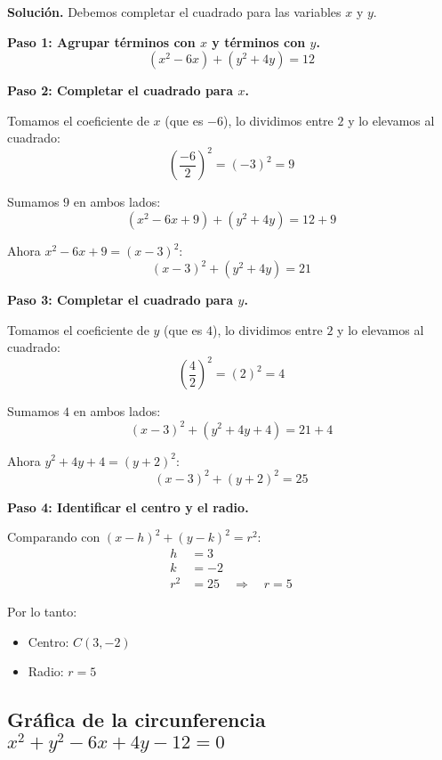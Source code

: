 \documentclass[12pt,a4paper]{article}
\begin{document}
	\textbf{Solución.} Debemos completar el cuadrado para las variables $x$ y $y$.

	\bigskip

	\textbf{Paso 1: Agrupar términos con $x$ y términos con $y$.}
	\[
	(x^2-6x)+(y^2+4y)=12
	\]

	\textbf{Paso 2: Completar el cuadrado para $x$.}

	Tomamos el coeficiente de $x$ (que es $-6$), lo dividimos entre $2$ y lo elevamos al cuadrado:
	\[
	\left(\frac{-6}{2}\right)^2=(-3)^2=9
	\]

	Sumamos $9$ en ambos lados:
	\[
	(x^2-6x+9)+(y^2+4y)=12+9
	\]

	Ahora $x^2-6x+9=(x-3)^2$:
	\[
	(x-3)^2+(y^2+4y)=21
	\]

	\textbf{Paso 3: Completar el cuadrado para $y$.}

	Tomamos el coeficiente de $y$ (que es $4$), lo dividimos entre $2$ y lo elevamos al cuadrado:
	\[
	\left(\frac{4}{2}\right)^2=(2)^2=4
	\]

	Sumamos $4$ en ambos lados:
	\[
	(x-3)^2+(y^2+4y+4)=21+4
	\]

	Ahora $y^2+4y+4=(y+2)^2$:
	\[
	(x-3)^2+(y+2)^2=25
	\]

	\textbf{Paso 4: Identificar el centro y el radio.}

	Comparando con $(x-h)^2+(y-k)^2=r^2$:
	\[
	\begin{aligned}
		h&=3\\
		k&=-2\\
		r^2&=25 \quad\Rightarrow\quad r=5
	\end{aligned}
	\]

	Por lo tanto:
	\begin{itemize}
		\item Centro: $\boxed{C(3,-2)}$
		\item Radio: $\boxed{r=5}$
	\end{itemize}

	\subsection*{Gráfica de la circunferencia $x^2+y^2-6x+4y-12=0$}
\end{document}
